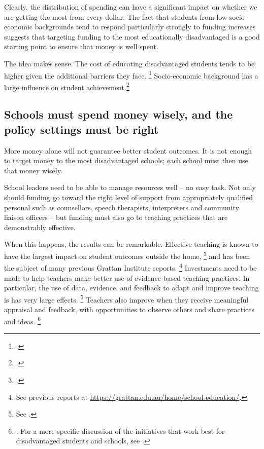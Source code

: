 \documentclass{grattan}
\begin{document}
Clearly, the distribution of spending can have a significant impact on whether we are getting the most from every dollar.
The fact that students from low socio-economic backgrounds tend to respond particularly strongly to funding increases suggests that targeting funding to the most educationally disadvantaged is a good starting point to ensure that money is well spent.

The idea makes sense. The cost of educating disadvantaged students tends to be higher given the additional barriers they face.%
\footcite{OECD2012EquityQualityEducation}
Socio-economic background has a large influence on student achievement.\footnote{\textcite{Hattie2008visiblelearningsynthesis}.}

\subsection{Schools must spend money wisely, and the policy settings must be right}\label{subsec:Schools-and-governments must spend money wisely}

More money alone will not guarantee better student outcomes.
It is not enough to target money to the most disadvantaged schools; each school must then use that money wisely.

School leaders need to be able to manage resources well -- no easy task.
Not only should funding go toward the right level of support from appropriately qualified personal such as counsellors, speech therapists, interpreters and community liaison officers -- but funding must also go to teaching practices that are demonstrably effective.

When this happens, the results can be remarkable.
Effective teaching is known to have the largest impact on student outcomes outside the home,%
\footcite{Hattie2008visiblelearningsynthesis}
and has been the subject of many previous Grattan Institute reports.%
\footnote{See previous reports at \textcolor{blue}{\url{https://grattan.edu.au/home/school-education/}}.}
Investments need to be made to help teachers make better use of evidence-based teaching practices.
In particular, the use of data, evidence, and feedback to adapt and improve teaching is has very large effects.%
\footnote{See \textcite{Goss2015TargetedTeachingHow}.}
Teachers also improve when they receive meaningful appraisal and feedback, with opportunities to observe others and share practices and ideas.%
\footnote{\textcite[][7]{Jensen2011BetterTeacherAppraisal}.
For a more specific discussion of the initiatives that work best for disadvantaged students and schools, see \textcite{OECD2012EquityQualityEducation}.}
\end{document}
